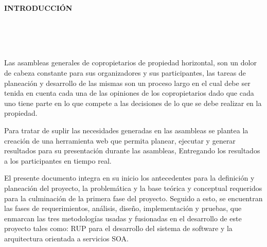 
\textbf{\LARGE INTRODUCCIÓN}\\\\
\\\\

\vspace{5mm}

Las asambleas generales de copropietarios de propiedad horizontal, son un dolor de cabeza constante para sus organizadores y sus participantes, las tareas de planeación y desarrollo de las mismas son un proceso largo en el cual debe ser tenida en cuenta cada una de las opiniones de los copropietarios dado que cada uno tiene parte en lo que compete a las decisiones de lo que se debe realizar en la propiedad.

\vspace{5mm}

Para tratar de suplir las necesidades generadas en las asambleas se plantea la creación de una herramienta web que permita planear, ejecutar y generar resultados para su presentación durante las asambleas, Entregando los resultados a los participantes en tiempo real.

\vspace{5mm}

El presente documento integra en su inicio los antecedentes para la definición y planeación del proyecto, la problemática y la base teórica y conceptual requeridos para la culminación de la primera fase del proyecto. Seguido a esto, se encuentran las fases de requerimientos, análisis, diseño, implementación y pruebas, que enmarcan las tres metodologías usadas y fusionadas en el desarrollo de este proyecto tales como: RUP para el desarrollo del sistema de software y la arquitectura orientada a servicios SOA.
\newpage